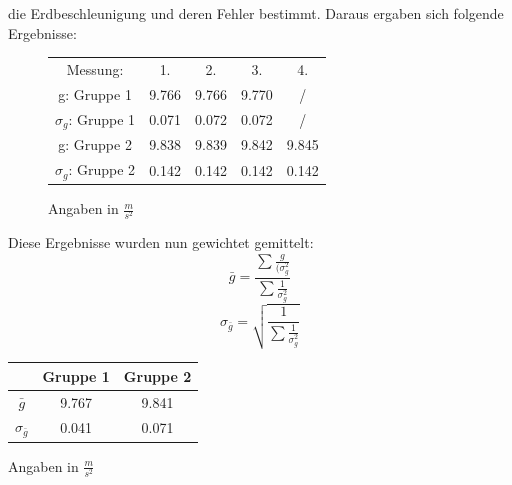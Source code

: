 \documentclass[12pt,a4paper]{article}
\begin{document}
die Erdbeschleunigung und deren Fehler bestimmt.
Daraus ergaben sich folgende Ergebnisse:
\begin{figure}[H]\centering
\begin{tabular}{c|c|c|c|c}
Messung: & 1. & 2. & 3. & 4. \\ 
g: Gruppe 1 & 9.766 & 9.766 & 9.770 & / \\ 
$\sigma_g$: Gruppe 1 & 0.071 & 0.072 & 0.072 & / \\ 
g: Gruppe 2 & 9.838 & 9.839 & 9.842 & 9.845 \\ 
$\sigma_g$: Gruppe 2 & 0.142 & 0.142 & 0.142 & 0.142 \\ 
\end{tabular} 
\newline
\newline
Angaben in $\frac{m}{s^2}$
\end{figure}

Diese Ergebnisse wurden nun gewichtet gemittelt:
\begin{equation}
\bar{g} = \frac{\sum{\frac{g}{(\sigma_g^2}}}{\sum{\frac{1}{\sigma_g^2}}}
\end{equation}
\begin{equation}
\sigma_{\bar{g}} = \sqrt{\frac{1}{\sum{\frac{1}{\sigma_g^2}}}}
\end{equation}
\begin{center}
\begin{tabular}{c|c|c}
 & Gruppe 1 & Gruppe 2 \\ 
\hline 
$\bar{g}$ & 9.767 & 9.841 \\ 
$\sigma_{\bar{g}}$ & 0.041 & 0.071 \\ 
\end{tabular} 
\newline
\newline
Angaben in $\frac{m}{s^2}$
\end{center}


\newpage
\end{document}
